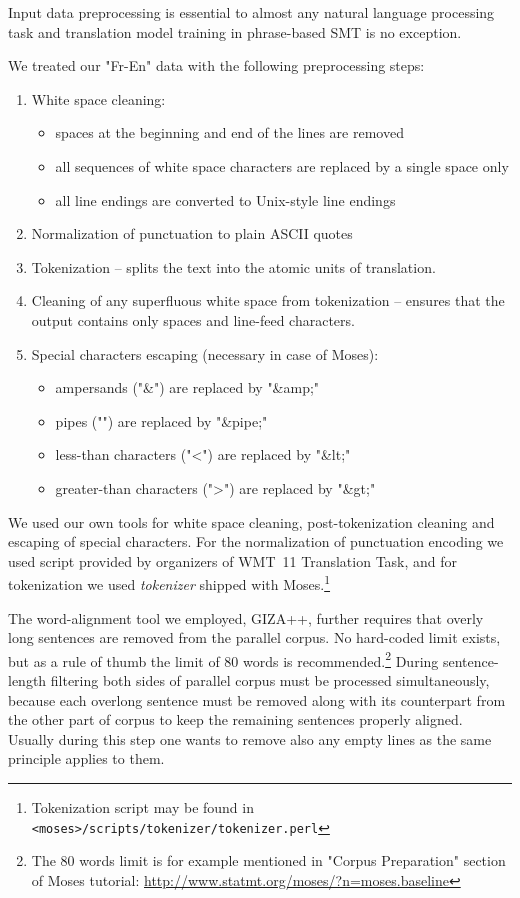 Input data preprocessing is essential to almost any natural language processing task
and translation model training in phrase-based SMT is no exception.

We treated our "Fr-En" data with the following preprocessing steps:
\begin{enumerate}
  \item White space cleaning:
  \begin{itemize}
    \item spaces at the beginning and end of the lines are removed
    \item all sequences of white space characters are replaced by a single space only
    \item all line endings are converted to Unix-style line endings
  \end{itemize}
  \item Normalization of punctuation to plain ASCII quotes
  \item Tokenization -- splits the text into the atomic units of translation.
  \item Cleaning of any superfluous white space from tokenization -- ensures that the output contains only spaces and line-feed characters.
  \item Special characters escaping (necessary in case of Moses):
  \begin{itemize}
    \item ampersands ("\&") are replaced by "\&amp;"
    \item pipes ("\textbar") are replaced by "\&pipe;"
    \item less-than characters ("<") are replaced by "\&lt;"
    \item greater-than characters (">") are replaced by "\&gt;"
  \end{itemize}
\end{enumerate}

We used our own tools for white space cleaning, post-tokenization cleaning
and escaping of special characters.
For the normalization of punctuation encoding we used script provided by organizers of
WMT~11 Translation Task,
and for tokenization we used \emph{tokenizer} shipped with
Moses.\footnote{Tokenization script may be found in \texttt{<moses>/scripts/tokenizer/tokenizer.perl}}

The word-alignment tool we employed, GIZA++, further requires that overly long sentences are
removed from the parallel corpus.
No hard-coded limit exists, but as a rule of thumb the limit of 80 words is
recommended.\footnote{The 80 words limit is for example mentioned in "Corpus Preparation"
section of Moses tutorial: \url{http://www.statmt.org/moses/?n=moses.baseline}}
During sentence-length filtering both sides of parallel corpus must be
processed simultaneously, because each overlong sentence must be removed along
with its counterpart from the other part of corpus to keep the remaining sentences
properly aligned.
Usually during this step one wants to remove also any empty lines as the same principle
applies to them.

